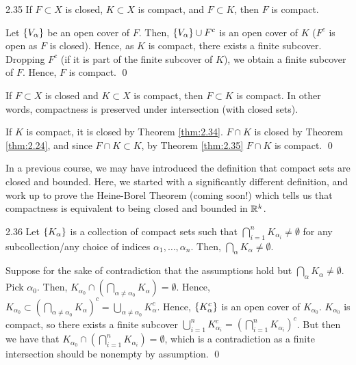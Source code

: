 \begin{theorem}{}{2.35}
    If $F \subset X$ is closed, $K \subset X$ is compact, and $F \subset K$, then $F$ is compact.
\end{theorem}

\begin{nproof}
    Let $\set{V_\alpha}$ be an open cover of $F$. Then, $\set{V_\alpha} \cup F^c$ is an open cover of $K$ ($F^c$ is open as $F$ is closed). Hence, as $K$ is compact, there exists a finite subcover. Dropping $F^c$ (if it is part of the finite subcover of $K$), we obtain a finite subcover of $F$. Hence, $F$ is compact. \qed
\end{nproof}

\begin{ncorollary}{}{}
    If $F \subset X$ is closed and $K \subset X$ is compact, then $F \subset K$ is compact. In other words, compactness is preserved under intersection (with closed sets).
\end{ncorollary}

\begin{nproof}
    If $K$ is compact, it is closed by Theorem \ref{thm:2.34}. $F \cap K$ is closed by Theorem \ref{thm:2.24}, and since $F \cap K \subset K$, by Theorem \ref{thm:2.35} $F \cap K$ is compact. \qed
\end{nproof}
\noindent In a previous course, we may have introduced the definition that compact sets are closed and bounded. Here, we started with a significantly different definition, and work up to prove the Heine-Borel Theorem (coming soon!) which tells us that compactness is equivalent to being closed and bounded in $\mathbb{R}^k$. 

\begin{theorem}{}{2.36}
    Let $\set{K_\alpha}$ is a collection of compact sets such that $\bigcap_{i=1}^n K_{\alpha_{i}} \neq \emptyset$ for any subcollection/any choice of indices $\alpha_1, \ldots, \alpha_n$. Then, $\bigcap_\alpha K_\alpha \neq \emptyset$.
\end{theorem}
\begin{nproof}
    Suppose for the sake of contradiction that the assumptions hold but $\bigcap_\alpha K_\alpha \neq \emptyset$. Pick $\alpha_0$. Then, $K_{\alpha_0} \cap (\bigcap_{\alpha \neq \alpha_0} K_\alpha) = \emptyset$. Hence, $K_{\alpha_0} \subset \left(\bigcap_{\alpha \neq \alpha_0} K_\alpha \right)^c = \bigcup_{\alpha \neq \alpha_0} K_\alpha^c$. Hence, $\set{K_\alpha^c}$ is an open cover of $K_{\alpha_0}$. $K_{\alpha_0}$ is compact, so there exists a finite subcover $\bigcup_{i=1}^n K_{\alpha_i}^c = \left(\bigcap_{i=1}^n K_{\alpha_i}\right)^c$. But then we have that $K_{\alpha_0} \cap \left(\bigcap_{i=1}^n K_{\alpha_i}\right) = \emptyset$, which is a contradiction as a finite intersection should be nonempty by assumption. \qed
\end{nproof}

